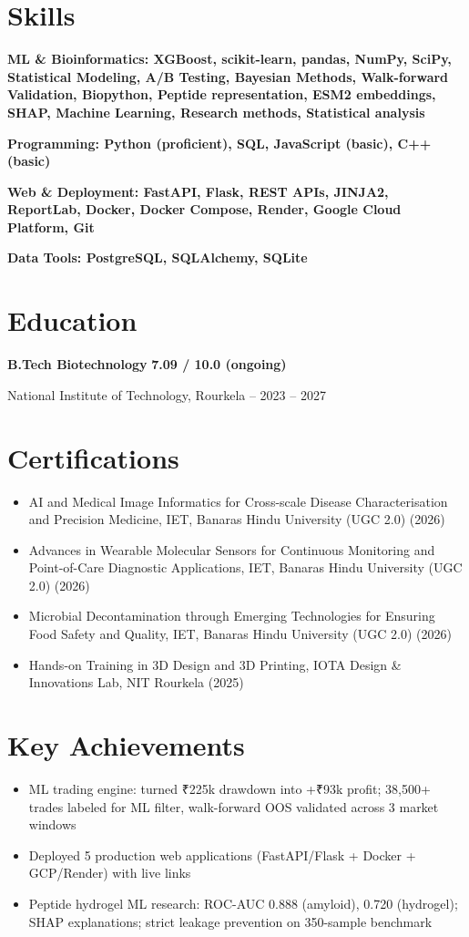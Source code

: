 \documentclass[11pt,a4paper]{article}
\begin{document}
\section*{Skills}
\noindent\textbf{ML \& Bioinformatics: XGBoost, scikit-learn, pandas, NumPy, SciPy, Statistical Modeling, A/B Testing, Bayesian Methods, Walk-forward Validation, Biopython, Peptide representation, ESM2 embeddings, SHAP, Machine Learning, Research methods, Statistical analysis}

\noindent\textbf{Programming: Python (proficient), SQL, JavaScript (basic), C++ (basic)}

\noindent\textbf{Web \& Deployment: FastAPI, Flask, REST APIs, JINJA2, ReportLab, Docker, Docker Compose, Render, Google Cloud Platform, Git}

\noindent\textbf{Data Tools: PostgreSQL, SQLAlchemy, SQLite}

\section*{Education}
\noindent\textbf{B.Tech Biotechnology} \hfill \textbf{7.09 / 10.0 (ongoing)}

\noindent National Institute of Technology, Rourkela -- 2023 – 2027

\section*{Certifications}
\begin{itemize}
    \item AI and Medical Image Informatics for Cross-scale Disease Characterisation and Precision Medicine, IET, Banaras Hindu University (UGC 2.0) (2026)
    \item Advances in Wearable Molecular Sensors for Continuous Monitoring and Point-of-Care Diagnostic Applications, IET, Banaras Hindu University (UGC 2.0) (2026)
    \item Microbial Decontamination through Emerging Technologies for Ensuring Food Safety and Quality, IET, Banaras Hindu University (UGC 2.0) (2026)
    \item Hands-on Training in 3D Design and 3D Printing, IOTA Design \& Innovations Lab, NIT Rourkela (2025)
\end{itemize}

\section*{Key Achievements}
\begin{itemize}
    \item ML trading engine: turned ₹225k drawdown into +₹93k profit; 38,500+ trades labeled for ML filter, walk-forward OOS validated across 3 market windows
    \item Deployed 5 production web applications (FastAPI/Flask + Docker + GCP/Render) with live links
    \item Peptide hydrogel ML research: ROC-AUC 0.888 (amyloid), 0.720 (hydrogel); SHAP explanations; strict leakage prevention on 350-sample benchmark
\end{itemize}
\end{document}

